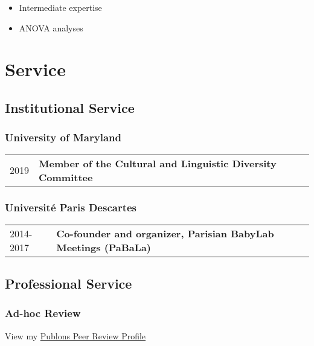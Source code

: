 \documentclass[10pt,a4paper,]{article}
\makeatletter
\providecommand{\tightlist}{%
  \setlength{\itemsep}{0pt}\setlength{\parskip}{0pt}}
\def\detaileditem#1#2#3#4#5{
#2 & \parbox[t]{0.85\textwidth}{%
      \textbf{#1}\hfill{\footnotesize #3}\\
      \ifx#4\empty\else#4\par\fi%
      \ifx#5\empty\else{%
        \vspace{0.1cm}\begin{minipage}{0.7\textwidth}%
        \begin{itemize}#5\end{itemize}%
        \end{minipage}}\fi%
      \vspace{\parsep}}\\}
\def\detailedsection#1{\begin{longtable}{@{\extracolsep{\fill}}ll}#1\end{longtable}}
\makeatother
\begin{document}
\begin{itemize}
\tightlist
\item
  Intermediate expertise
\item
  ANOVA analyses
\end{itemize}

\hypertarget{service}{%
\section{Service}\label{service}}

\hypertarget{institutional-service}{%
\subsection{Institutional Service}\label{institutional-service}}

\hypertarget{university-of-maryland-1}{%
\subsubsection{University of Maryland}\label{university-of-maryland-1}}

\detailedsection{\detaileditem{Member of the Cultural and Linguistic Diversity Committee}{2019}{}{}{\empty}\detaileditem{Panel judge for Graduate Research Appreciation Day}{2018}{}{}{\empty}}

\hypertarget{universituxe9-paris-descartes-1}{%
\subsubsection{Université Paris Descartes}\label{universituxe9-paris-descartes-1}}

\detailedsection{\detaileditem{Co-founder and organizer, Parisian BabyLab Meetings (PaBaLa)}{2014-2017}{}{}{\empty}\detaileditem{Co-Chair, Student and Post-doc Talks (SPOT)}{2014-2016}{}{}{\empty}}

\hypertarget{professional-service}{%
\subsection{Professional Service}\label{professional-service}}

\hypertarget{ad-hoc-review}{%
\subsubsection{Ad-hoc Review}\label{ad-hoc-review}}

View my \href{https://publons.com/researcher/1230020/katie-von-holzen/peer-review/}{Publons Peer Review Profile}
\end{document}

